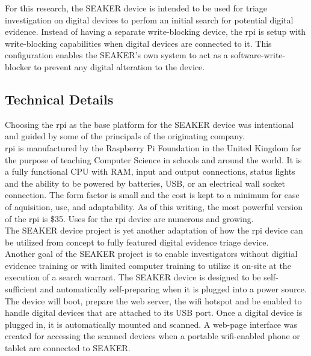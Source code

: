 \documentclass[12pt]{article}
\begin{document}
For this research, the SEAKER device is intended to be used for triage investigation
on digital devices to perfom an initial search for potential digital evidence.
Instead of having a separate write-blocking device, the \gls{rpi} is setup with
write-blocking capabilities when digital devices are connected to it.  This
configuration enables the SEAKER's own system to act as a software-write-blocker
to prevent any digital alteration to the device.\\

\subsection{Technical Details}

Choosing the \gls{rpi} as the base platform for the SEAKER device was intentional
and guided by some of the principals of the originating company.\\

\gls{rpi} is manufactured by the Raspberry Pi Foundation in the United Kingdom
for the purpose of teaching Computer Science in schools and around the world.  It
is a fully functional CPU with RAM, input and output connections, status lights
and the ability
to be powered by batteries, USB, or an electrical wall socket connection.
The form factor is small and the cost is kept to a minimum for ease of
aquisition, use, and adaptability.  As of this writing,
the most powerful version of the \gls{rpi} is \$35.  Uses for the \gls{rpi}
device are numerous and growing.\\

The SEAKER device project is yet another adaptation of how the \gls{rpi} device
can be utilized from concept to fully featured digital evidence triage device.\\

Another goal of the SEAKER project is to enable investigators without 
digitial evidence training or with limited computer training to utilize it
on-site at the execution of a search warrant.  The SEAKER device is designed to
be self-sufficient and automatically self-preparing when it is plugged into a 
power source.  The device will boot, prepare the web server, the wifi hotspot
and be enabled to handle digital devices that are attached to its USB port.
Once a digital device is plugged in, it is automatically mounted and scanned.
A web-page interface was created for accessing the scanned devices when a portable
wifi-enabled phone or tablet are connected to SEAKER.\\
\end{document}
